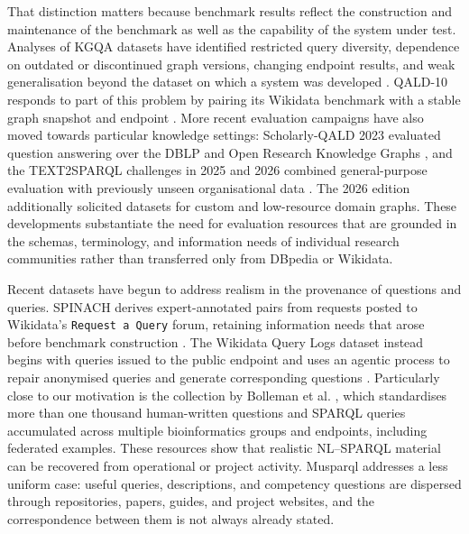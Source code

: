 That distinction matters because benchmark results reflect the construction and maintenance of the benchmark as well as the capability of the system under test. Analyses of KGQA datasets have identified restricted query diversity, dependence on outdated or discontinued graph versions, changing endpoint results, and weak generalisation beyond the dataset on which a system was developed \citep{steinmetz2021kgqa, jiang2022generalizability}. QALD-10 responds to part of this problem by pairing its Wikidata benchmark with a stable graph snapshot and endpoint \citep{usbeck2023qald10}. More recent evaluation campaigns have also moved towards particular knowledge settings: Scholarly-QALD 2023 evaluated question answering over the DBLP and Open Research Knowledge Graphs \citep{banerjee2023scholarlyqald}, and the TEXT2SPARQL challenges in 2025 and 2026 combined general-purpose evaluation with previously unseen organisational data \citep{tramp2025text2sparql, text2sparql2026datasets}. The 2026 edition additionally solicited datasets for custom and low-resource domain graphs. These developments substantiate the need for evaluation resources that are grounded in the schemas, terminology, and information needs of individual research communities rather than transferred only from DBpedia or Wikidata.

Recent datasets have begun to address realism in the provenance of questions and queries. SPINACH derives expert-annotated pairs from requests posted to Wikidata's \texttt{Request\ a\ Query} forum, retaining information needs that arose before benchmark construction \citep{liu2024spinach}. The Wikidata Query Logs dataset instead begins with queries issued to the public endpoint and uses an agentic process to repair anonymised queries and generate corresponding questions \citep{walter2026wdql}. Particularly close to our motivation is the collection by Bolleman et al. \citep{bolleman2025bioinformatics}, which standardises more than one thousand human-written questions and SPARQL queries accumulated across multiple bioinformatics groups and endpoints, including federated examples. These resources show that realistic NL--SPARQL material can be recovered from operational or project activity. Musparql addresses a less uniform case: useful queries, descriptions, and competency questions are dispersed through repositories, papers, guides, and project websites, and the correspondence between them is not always already stated.

